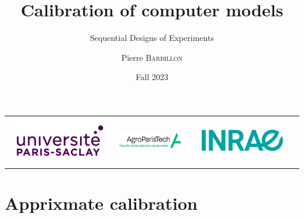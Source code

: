\documentclass[nopagenumber,9pt]{beamer}
\title[Sequential Designs]{Calibration of computer models}
\subtitle{Sequential Designs of Experiments}
\author[P. Barbillon]{ Pierre \textsc{Barbillon}}
\date{Fall 2023}
\begin{document}
\begin{frame}
\titlepage
\vspace{-1cm}
\centering
\begin{tabular}{ccc}
 \includegraphics[scale=.08]{LogoUPSaclay.jpg}&
  \includegraphics[scale=1.3]{agrologo.png}&
   \includegraphics[scale=.1]{LogoINRAE.jpg}
\end{tabular}


\end{frame}



\section{Apprixmate calibration}
\end{document}
